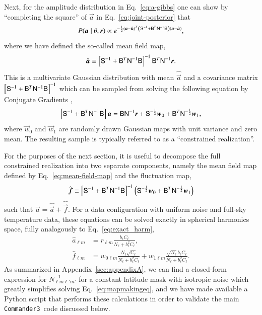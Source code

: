 \documentclass[twocolumn]{../common/aa}
\def\commanderthree{\texttt{Commander3}}
\newcommand{\B}[0]{\tens{B}}
\renewcommand{\a}[0]{\vec{a}}
\newcommand{\f}[0]{\vec{f}}
\newcommand{\N}[0]{\tens{N}}
\newcommand{\w}[0]{\vec{w}}
\renewcommand{\S}[0]{\tens{S}}
\renewcommand{\r}[0]{\vec{r}}
\begin{document}
Next, for the amplitude distribution in Eq.~\eqref{eq:a-gibbs} one can show by ``completing the square'' of $\a$ in Eq.~\eqref{eq:joint-posterior} that 
\begin{equation}
    P(\a \mid \theta, \r) \propto e^{-\frac12 \left(\a - \hat{\a}\right)^T \left(\S^{-1} + \B^T\N^{-1}\B\right) \left(\a - {\hat{\a}}\right)},
\end{equation}
where we have defined the so-called mean field map,
\begin{equation}
\label{eq:mean-field-map}
\hat{\a} \equiv \left[\S^{-1} + \B^T \N^{-1}\B \right]^{-1} \B^T \N^{-1} \r.
\end{equation}
This is a multivariate Gaussian distribution with mean $\hat{\a}$ and a covariance matrix $\left[\S^{-1} + \B^T \N^{-1}\B \right]^{-1}$ which can be sampled from solving the following equation by Conjugate Gradients \citep{shewchuk:1994,seljebotn:2019},
\begin{equation}
    \label{eq:mapmakingeq}
    \left[\S^{-1} + \B^T \N^{-1}\B \right]\a = \B \N^{-1} \r + \S^{-\frac{1}{2}}\w_0 +\B^T \N^{-\frac{1}{2}}\w_1,
\end{equation}
where $\w_0$ and $\w_1$ are randomly drawn Gaussian maps with unit variance and zero mean. The resulting sample is typically referred to as a ``constrained realization''.

For the purposes of the next section, it is useful to decompose the full constrained realization into two separate components, namely the mean field map defined by Eq.~\eqref{eq:mean-field-map} and the fluctuation map, 
\begin{equation}
\label{eq:fluc-map}
\hat{\f} \equiv \left[\S^{-1} + \B^T \N^{-1}\B \right]^{-1} \left(\S^{-\frac{1}{2}}\w_0 +\B^T \N^{-\frac{1}{2}}\w_1 \right)
\end{equation}
such that $\a = \hat{\a} + \hat{\f}$. For a data configuration with uniform noise and full-sky temperature data, these equations can be solved exactly in spherical harmonics space, fully analogously to Eq.~\eqref{eq:exact_harm},
\begin{align}
    \label{eq:hat_s_approx}
    \hat{a}_{\ell m} &= r_{\ell m}\frac{b_{\ell}C_{\ell}}{N_\ell + b_{\ell}^2C_{\ell}},\\
    \label{eq:hat_f_approx}
    \hat{f}_{\ell m} &= w_{0\ell m}\frac{N_{\ell}\sqrt{C_{\ell}}}{N_\ell + b_{\ell}^2C_{\ell}}+w_{1\ell m}\frac{\sqrt{N_{\ell}}b_{\ell}C_\ell}{N_\ell + b_{\ell}^2C_{\ell}}.
\end{align}
As summarized in 
Appendix~\ref{sec:appendixA}, we can find a closed-form expression for $N_{\ell m\ell'm'}^{-1}$ for a constant latitude mask with isotropic noise which greatly simplifies solving Eq.~\eqref{eq:mapmakingeq}, and we have made available a Python script that performs these calculations in order to validate the main \commanderthree\ code discussed below.
\end{document}
